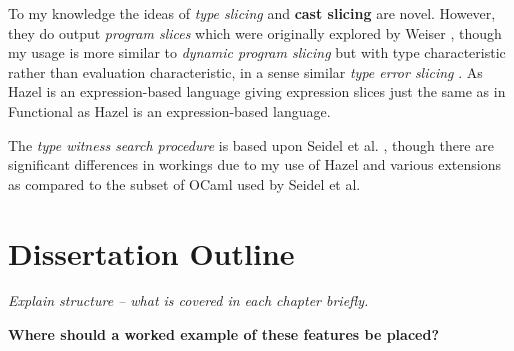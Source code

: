 To my knowledge the ideas of \textit{type slicing} and \textbf{cast slicing} are novel. However, they do output \textit{program slices} which were originally explored by Weiser \cite{ProgSlice}, though my usage is more similar to \textit{dynamic program slicing} \cite{DynProgSlice} but with type characteristic rather than evaluation characteristic, in a sense similar \textit{type error slicing} \cite{ErrSlice}. As Hazel is an expression-based language giving expression slices just the same as in Functional as Hazel is an expression-based language.

The \textit{type witness search procedure} is	 based upon Seidel et al. \cite{SearchProc}, though there are significant differences in workings due to my use of Hazel and various extensions as compared to the subset of OCaml used by Seidel et al.

\section{Dissertation Outline}
\textit{Explain structure -- what is covered in each chapter briefly.}

\textbf{
Where should a worked example of these features be placed?}
